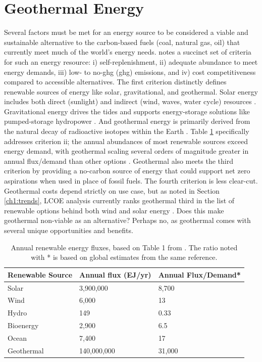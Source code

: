 \section{Geothermal Energy}\label{ch1:geothermal}
Several factors must be met for an energy source to be considered a viable and sustainable alternative to the carbon-based fuels (coal, natural gas, oil) that currently meet much of the world’s energy needs.
\citet{glassley_geothermal_2015} notes a succinct set of criteria for such an energy resource: i) self-replenishment, ii) adequate abundance to meet energy demands, iii) low- to no-\acrlong{ghg} (\acrshort{ghg}) emissions, and iv) cost competitiveness compared to accessible alternatives. The first criterion distinctly defines renewable sources of energy like solar, gravitational, and geothermal. Solar energy includes both direct (sunlight) and indirect (wind, waves, water cycle) resources \citep{hohmeyer_ipcc_2008}. Gravitational energy drives the tides and supports energy-storage solutions like pumped-storage hydropower \citep{eere_pumped-storage_2021,hohmeyer_ipcc_2008}. And geothermal energy is primarily derived from the natural decay of radioactive isotopes within the Earth \citep{hohmeyer_ipcc_2008}. Table \ref{tab:renewableflux} specifically addresses criterion ii; the annual abundances of most renewable sources exceed energy demand, with geothermal scaling several orders of magnitude greater in annual flux/demand than other options \citep{hohmeyer_ipcc_2008}. Geothermal also meets the third criterion by providing a no-carbon source of energy that could support net zero aspirations when used in place of fossil fuels. The fourth criterion is less clear-cut. Geothermal costs depend strictly on use case, but as noted in Section \ref{ch1:trends}, LCOE analysis currently ranks geothermal third in the list of renewable options behind both wind and solar energy \citep{lazard_lazards_2020}. Does this make geothermal non-viable as an alternative? Perhaps no, as geothermal comes with several unique opportunities and benefits.

\begin{table}[h!]
\centering
\begin{tabular}{|l|l|l|}
\hline
\textbf{Renewable Source} & \textbf{Annual flux (EJ/yr)} & \textbf{Annual Flux/Demand*} \\ \hline
Solar      & 3,900,000   & 8,700  \\ \hline
Wind       & 6,000       & 13     \\ \hline
Hydro      & 149         & 0.33   \\ \hline
Bioenergy  & 2,900       & 6.5    \\ \hline
Ocean      & 7,400       & 17     \\ \hline
Geothermal & 140,000,000 & 31,000 \\ \hline
\end{tabular}
\caption[Annual renewable energy fluxes]{Annual renewable energy fluxes, based on Table 1 from \protect\citep{hohmeyer_ipcc_2008}. The ratio noted with * is based on global estimates from the same reference.}
\label{tab:renewableflux}
\end{table}

